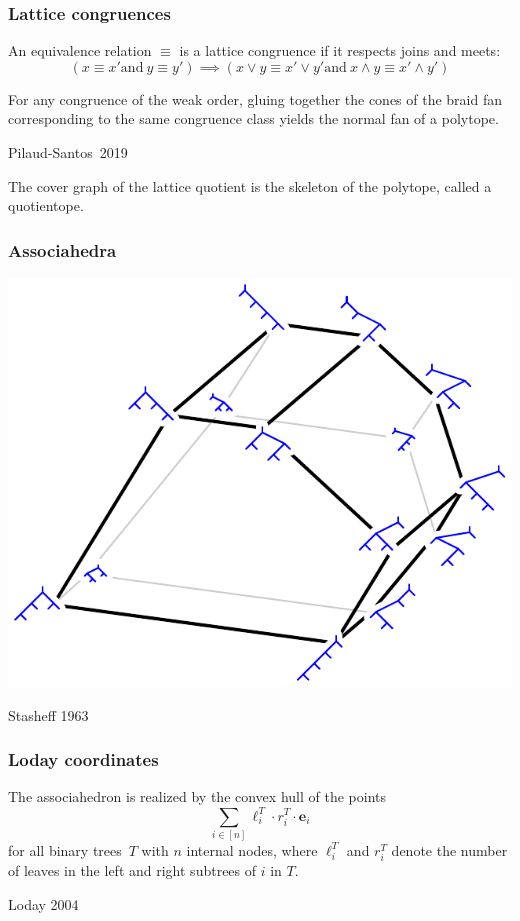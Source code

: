 \documentclass[11pt]{beamer}%
\newcommand{\red}{\color{darkred}}
\newcommand{\green}{\color{darkgreen}}
\newcommand{\auth}[1]{{\green\hfill{\footnotesize #1}}}
\renewcommand{\em }{\red}
\renewcommand{\b}[1]{{\boldsymbol{#1}}} %
\begin{document}
\begin{frame}
  \frametitle{Lattice congruences}
  An equivalence relation $\equiv$ is a {\em lattice congruence} if it respects joins and meets:
  $$
  (x\equiv x' \mathrm{and\ } y\equiv y')\implies (x\vee y\equiv x'\vee y'\mathrm{and\ }  x\wedge y\equiv x'\wedge y') 
  $$
  \pause
  \begin{theorem}
    For any congruence of the weak order, gluing together the cones of the braid fan corresponding to the same congruence class yields the normal fan of a polytope.
  \end{theorem}
  \auth{Pilaud-Santos~2019}

  \pause
  The cover graph of the {\em lattice quotient} is the skeleton of the polytope, called a {\em quotientope}.
\end{frame}

\begin{frame}
  \frametitle{Associahedra}
    \begin{center}
      \includegraphics[height=.7\textheight]{associahedron4.pdf}
    \end{center}
    \auth{Stasheff 1963}
\end{frame}

\begin{frame}
  \frametitle{Loday coordinates}

  \begin{theorem}
  The associahedron is realized by the convex hull of the points
  \[
  \sum_{i\in [n]} \ell^T_i\cdot r^T_i \cdot \b{e}_i
  \]
  for all binary trees~$T$ with $n$ internal nodes, where $\ell^T_i$ and $r^T_i$ denote the number of leaves in the left and right subtrees of $i$ in $T$.
  \end{theorem}
  \auth{Loday 2004}  
\end{frame}
\end{document}
